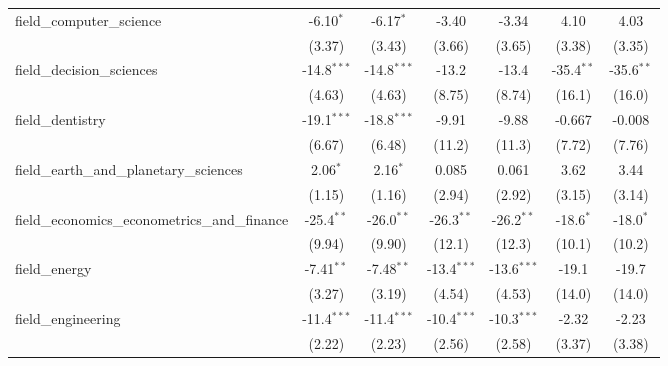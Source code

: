 \begin{tabular}{lcccccc}
   field\_computer\_science                                    & -6.10$^{*}$    & -6.17$^{*}$   & -3.40         & -3.34         & 4.10          & 4.03\\   
                                                               & (3.37)         & (3.43)        & (3.66)        & (3.65)        & (3.38)        & (3.35)\\   
   field\_decision\_sciences                                   & -14.8$^{***}$  & -14.8$^{***}$ & -13.2         & -13.4         & -35.4$^{**}$  & -35.6$^{**}$\\   
                                                               & (4.63)         & (4.63)        & (8.75)        & (8.74)        & (16.1)        & (16.0)\\   
   field\_dentistry                                            & -19.1$^{***}$  & -18.8$^{***}$ & -9.91         & -9.88         & -0.667        & -0.008\\   
                                                               & (6.67)         & (6.48)        & (11.2)        & (11.3)        & (7.72)        & (7.76)\\   
   field\_earth\_and\_planetary\_sciences                      & 2.06$^{*}$     & 2.16$^{*}$    & 0.085         & 0.061         & 3.62          & 3.44\\   
                                                               & (1.15)         & (1.16)        & (2.94)        & (2.92)        & (3.15)        & (3.14)\\   
   field\_economics\_econometrics\_and\_finance                & -25.4$^{**}$   & -26.0$^{**}$  & -26.3$^{**}$  & -26.2$^{**}$  & -18.6$^{*}$   & -18.0$^{*}$\\   
                                                               & (9.94)         & (9.90)        & (12.1)        & (12.3)        & (10.1)        & (10.2)\\   
   field\_energy                                               & -7.41$^{**}$   & -7.48$^{**}$  & -13.4$^{***}$ & -13.6$^{***}$ & -19.1         & -19.7\\   
                                                               & (3.27)         & (3.19)        & (4.54)        & (4.53)        & (14.0)        & (14.0)\\   
   field\_engineering                                          & -11.4$^{***}$  & -11.4$^{***}$ & -10.4$^{***}$ & -10.3$^{***}$ & -2.32         & -2.23\\   
                                                               & (2.22)         & (2.23)        & (2.56)        & (2.58)        & (3.37)        & (3.38)\\   

\end{tabular}
